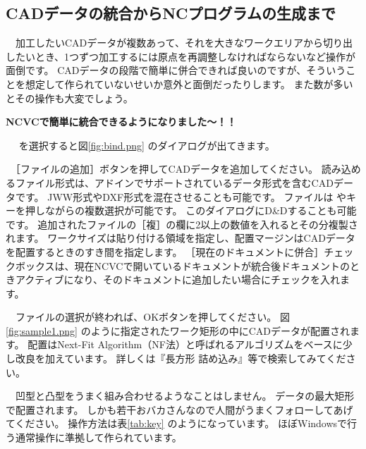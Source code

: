 

\subsection{CADデータの統合からNCプログラムの生成まで}
　加工したいCADデータが複数あって、それを大きなワークエリアから切り出したいとき、1つずつ加工するには原点を再調整しなければならないなど操作が面倒です。
CADデータの段階で簡単に併合できれば良いのですが、そういうことを想定して作られていないせいか意外と面倒だったりします。
また数が多いとその操作も大変でしょう。
\begin{center}
\textbf{NCVCで簡単に統合できるようになりました～！！}
\end{center}
　 を選択すると図\ref{fig:bind.png} のダイアログが出てきます。


　［ファイルの追加］ボタンを押してCADデータを追加してください。
読み込めるファイル形式は、アドインでサポートされているデータ形式を含むCADデータです。
JWW形式やDXF形式を混在させることも可能です。
ファイルは やキーを押しながらの複数選択が可能です。
このダイアログにD\&Dすることも可能です。
追加されたファイルの［複］の欄に2以上の数値を入れるとその分複製されます。
ワークサイズは貼り付ける領域を指定し、配置マージンはCADデータを配置するときのすき間を指定します。
［現在のドキュメントに併合］チェックボックスは、現在NCVCで開いているドキュメントが統合後ドキュメントのときアクティブになり、そのドキュメントに追加したい場合にチェックを入れます。

　ファイルの選択が終われば、OKボタンを押してください。
図\ref{fig:sample1.png} のように指定されたワーク矩形の中にCADデータが配置されます。
配置はNext-Fit Algorithm（NF法）と呼ばれるアルゴリズムをベースに少し改良を加えています。
詳しくは『長方形 詰め込み』等で検索してみてください。


　凹型と凸型をうまく組み合わせるようなことはしません。
データの最大矩形で配置されます。
しかも若干おバカさんなので人間がうまくフォローしてあげてください。
操作方法は表\ref{tab:key} のようになっています。
ほぼWindowsで行う通常操作に準拠して作られています。

